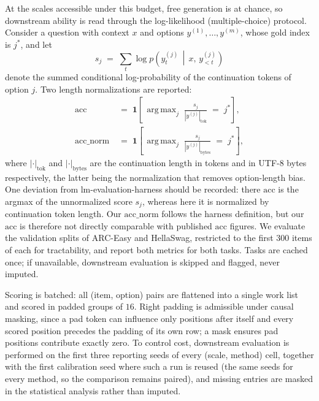 \documentclass[final,5p,times,twocolumn]{elsarticle}
\theoremstyle{remark}
\DeclareMathOperator*{\argmax}{arg\,max}
\begin{document}
At the scales accessible under this budget, free generation is at chance, so
downstream ability is read through the log-likelihood (multiple-choice)
protocol. Consider a question with context $x$ and options
$y^{(1)},\dots,y^{(m)}$, whose gold index is $j^{\ast}$, and let
\begin{equation}
\label{eq:lmscore}
s_{j} \;=\; \sum_{t} \log p\!\left(y^{(j)}_{t} \,\middle|\, x,\, y^{(j)}_{<t}\right)
\end{equation}
denote the summed conditional log-probability of the continuation tokens of
option $j$. Two length normalizations are reported:
\begin{equation}
\label{eq:lmeval}
\begin{aligned}
\mathrm{acc} \;&=\; \mathbf{1}\!\left[\,
\argmax_{j}\; \frac{s_{j}}{|y^{(j)}|_{\mathrm{tok}}} \;=\; j^{\ast}\right],\\[0.6ex]
\mathrm{acc\_norm} \;&=\; \mathbf{1}\!\left[\,
\argmax_{j}\; \frac{s_{j}}{|y^{(j)}|_{\mathrm{bytes}}} \;=\; j^{\ast}\right],
\end{aligned}
\end{equation}
where $|\cdot|_{\mathrm{tok}}$ and $|\cdot|_{\mathrm{bytes}}$ are the
continuation length in tokens and in UTF-8 bytes respectively, the latter being
the normalization that removes option-length bias. One deviation from
lm-evaluation-harness \cite{gao2023} should be recorded: there $\mathrm{acc}$ is the argmax of
the unnormalized score $s_{j}$, whereas here it is normalized by continuation
token length. Our $\mathrm{acc\_norm}$ follows the harness definition, but our
$\mathrm{acc}$ is therefore not directly comparable with published
$\mathrm{acc}$ figures. We evaluate the
validation splits of ARC-Easy and HellaSwag, restricted to the first $300$ items
of each for tractability, and report both metrics for both tasks. Tasks are
cached once; if unavailable, downstream evaluation is skipped and flagged, never
imputed.

Scoring is batched: all (item, option) pairs are flattened into a single work
list and scored in padded groups of $16$. Right padding is admissible under
causal masking, since a pad token can influence only positions after itself and
every scored position precedes the padding of its own row; a mask ensures pad
positions contribute exactly zero. To control cost, downstream evaluation is
performed on the first three reporting seeds of every (scale, method) cell,
together with the first calibration seed where such a run is reused (the same
seeds for every method, so the comparison remains paired), and missing entries
are masked in the statistical analysis rather than imputed.
\end{document}
